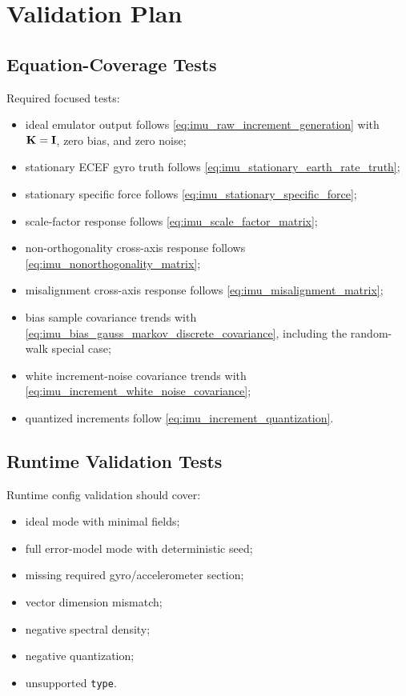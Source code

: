 \chapter{Validation Plan}

\section{Equation-Coverage Tests}

Required focused tests:
\begin{itemize}
    \item ideal emulator output follows
    \cref{eq:imu_raw_increment_generation} with $\mathbf{K}=\mathbf{I}$, zero bias, and zero
    noise;
    \item stationary ECEF gyro truth follows
    \cref{eq:imu_stationary_earth_rate_truth};
    \item stationary specific force follows
    \cref{eq:imu_stationary_specific_force};
    \item scale-factor response follows
    \cref{eq:imu_scale_factor_matrix};
    \item non-orthogonality cross-axis response follows
    \cref{eq:imu_nonorthogonality_matrix};
    \item misalignment cross-axis response follows
    \cref{eq:imu_misalignment_matrix};
    \item bias sample covariance trends with
    \cref{eq:imu_bias_gauss_markov_discrete_covariance}, including the
    random-walk special case;
    \item white increment-noise covariance trends with
    \cref{eq:imu_increment_white_noise_covariance};
    \item quantized increments follow
    \cref{eq:imu_increment_quantization}.
\end{itemize}

\section{Runtime Validation Tests}

Runtime config validation should cover:
\begin{itemize}
    \item ideal mode with minimal fields;
    \item full error-model mode with deterministic seed;
    \item missing required gyro/accelerometer section;
    \item vector dimension mismatch;
    \item negative spectral density;
    \item negative quantization;
    \item unsupported \texttt{type}.
\end{itemize}

